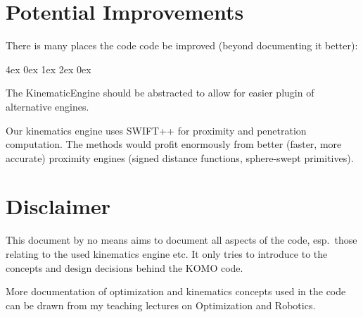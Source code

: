 \documentclass[10pt,fleqn,twoside]{article}
\newenvironment{items}{
\par\small
\begin{list}{--}{\leftmargin4ex \rightmargin0ex \labelsep1ex \labelwidth2ex
\topsep0pt \parsep0ex \itemsep3pt}
}{
\end{list}
}
\begin{document}






\section{Potential Improvements}

There is many places the code code be improved (beyond documenting it
better):
\begin{items}
\item The KinematicEngine should be abstracted to allow for easier
plugin of alternative engines.

\item Our kinematics engine uses SWIFT++ for proximity and penetration
computation. The methods would profit enormously from better (faster,
more accurate) proximity engines (signed distance functions, sphere-swept
primitives).
\end{items}

\section{Disclaimer}

This document by no means aims to document all aspects of the code,
esp.\ those relating to the used kinematics engine etc. It only tries
to introduce to the concepts and design decisions behind the KOMO
code.

More documentation of optimization and kinematics concepts used in the
code can be drawn from my teaching lectures on Optimization and
Robotics.


%
%
\end{document}
